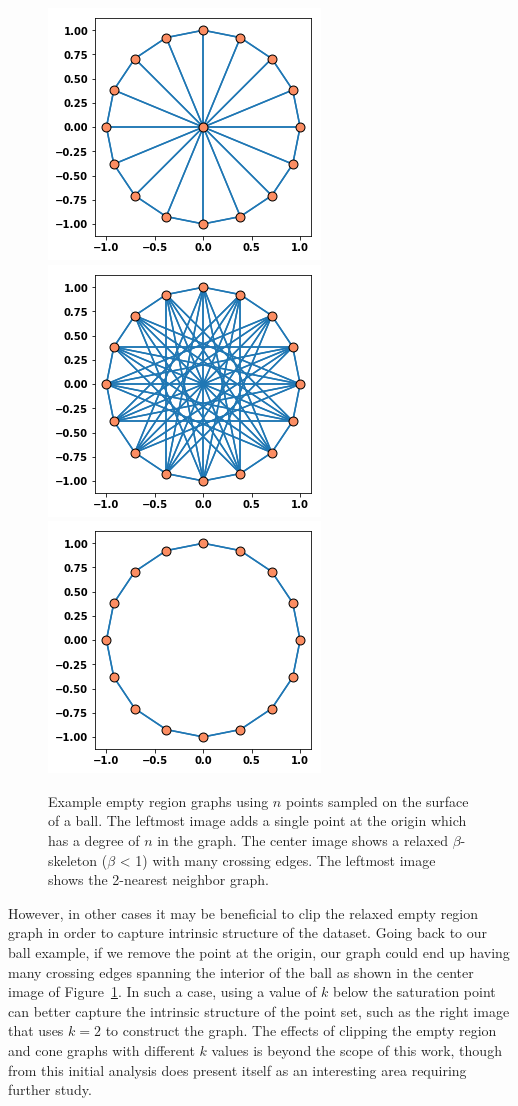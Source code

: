 \begin{figure}[!t]
    \centering
      \includegraphics[width=.3\linewidth]{figs/chap7/circle_2.png}
      \includegraphics[width=.3\linewidth]{figs/chap7/circle_3.png}
      \includegraphics[width=.3\linewidth]{figs/chap7/circle_1.png}
     \caption{Example empty region graphs using $n$ points sampled on the
     surface of a ball. The leftmost image adds a single point at the
     origin which has a degree of $n$ in the graph. The center image shows
     a relaxed $\beta$-skeleton ($\beta$ < 1) with many crossing edges.
     The leftmost image shows the 2-nearest neighbor graph.
     }
    \label{fig:circle_graphs}
    \vspace{-0.1in}
\end{figure}

However, in other cases it may be beneficial to clip the relaxed empty region graph in order to capture intrinsic structure of the dataset.
%
Going back to our ball example, if we remove the point at the origin, our graph could end up having many crossing edges spanning the interior of the ball as shown in the center image of Figure~\ref{fig:circle_graphs}.
%
In such a case, using a value of $k$ below the saturation point can better capture the intrinsic structure of the point set, such as the right image that uses $k=2$ to construct the graph.
%
The effects of clipping the empty region and cone graphs with different $k$ values is beyond the scope of this work, though from this initial analysis does present itself as an interesting area requiring further study.

